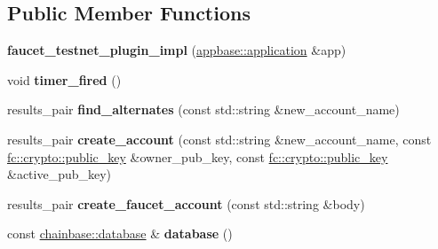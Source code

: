 \subsection*{Public Member Functions}
\begin{DoxyCompactItemize}
\item 
\mbox{\label{structaacio_1_1faucet__testnet__plugin__impl_a4fa518e891777de4fe95043f3b6b1976}} 
{\bfseries faucet\+\_\+testnet\+\_\+plugin\+\_\+impl} (\mbox{\hyperlink{classappbase_1_1application}{appbase\+::application}} \&app)
\item 
\mbox{\label{structaacio_1_1faucet__testnet__plugin__impl_aacca3ce532fc9a8155ea96a6c16fe89c}} 
void {\bfseries timer\+\_\+fired} ()
\item 
\mbox{\label{structaacio_1_1faucet__testnet__plugin__impl_a3e491c7b6f1e89e4bcf52eb9e3e3ff39}} 
results\+\_\+pair {\bfseries find\+\_\+alternates} (const std\+::string \&new\+\_\+account\+\_\+name)
\item 
\mbox{\label{structaacio_1_1faucet__testnet__plugin__impl_a9a0c480cbf7fbf4f4a10b5b21181017d}} 
results\+\_\+pair {\bfseries create\+\_\+account} (const std\+::string \&new\+\_\+account\+\_\+name, const \mbox{\hyperlink{classfc_1_1crypto_1_1public__key}{fc\+::crypto\+::public\+\_\+key}} \&owner\+\_\+pub\+\_\+key, const \mbox{\hyperlink{classfc_1_1crypto_1_1public__key}{fc\+::crypto\+::public\+\_\+key}} \&active\+\_\+pub\+\_\+key)
\item 
\mbox{\label{structaacio_1_1faucet__testnet__plugin__impl_a4e5b2a9b216ef4cf7c7c337c52badd4c}} 
results\+\_\+pair {\bfseries create\+\_\+faucet\+\_\+account} (const std\+::string \&body)
\item 
\mbox{\label{structaacio_1_1faucet__testnet__plugin__impl_a878c043b478b5296e968f0e1ece0b6fb}} 
const \mbox{\hyperlink{classchainbase_1_1database}{chainbase\+::database}} \& {\bfseries database} ()
\end{DoxyCompactItemize}
